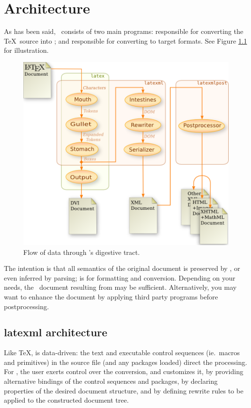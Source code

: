 \documentclass{book}
\begin{document}
\chapter{Architecture}\label{architecture}
As has been said, \LaTeXML\ consists of two main programs:
 responsible for converting the \TeX\ source into \XML;
and  responsible for converting to target formats.
See Figure \ref{fig:dataflow} for illustration.

\begin{figure}[tb]
\begin{center}
\includegraphics[width=\textwidth]{figures/digestion}
\end{center}
\caption{Flow of data through \LaTeXML's digestive tract.\label{fig:dataflow}}
\end{figure}

The intention is that all semantics of the original document is
preserved by , or even inferred by parsing;
 is for formatting and conversion.
Depending on your needs, the \LaTeXML\ document resulting from  may be
sufficient. Alternatively, you may want to enhance the document
by applying third party programs before postprocessing.

\section{latexml architecture}\label{latexmlarchitecture}
Like \TeX,  is data-driven: the text and executable control
sequences (ie.~macros and primitives)
in the source file (and any packages loaded) direct the processing.
For \LaTeXML, the user exerts control over the conversion, and customizes it, by 
providing alternative bindings of the control sequences and packages,
by declaring properties of the desired document structure,
and by defining rewrite rules to be applied to the constructed document tree.
\end{document}
